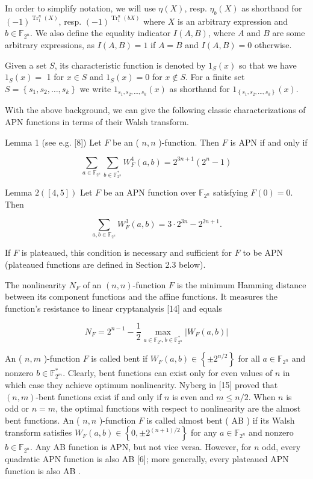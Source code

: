 \documentclass[10pt]{article}
\begin{document}
In order to simplify notation, we will use $\eta(X)$, resp. $\eta_{b}(X)$ as shorthand for $(-1)^{\operatorname{Tr}_{1}^{n}(X)}$, resp. $(-1)^{\operatorname{Tr}_{1}^{n}(b X)}$ where $X$ is an arbitrary expression and $b \in \mathbb{F}_{2^{n}}$. We also define the equality indicator $I(A, B)$, where $A$ and $B$ are some arbitrary expressions, as $I(A, B)=1$ if $A=B$ and $I(A, B)=0$ otherwise.

Given a set $S$, its characteristic function is denoted by $1_{S}(x)$ so that we have $1_{S}(x)=$ 1 for $x \in S$ and $1_{S}(x)=0$ for $x \notin S$. For a finite set $S=\left\{s_{1}, s_{2}, \ldots, s_{k}\right\}$ we write $1_{s_{1}, s_{2}, \ldots, s_{k}}(x)$ as shorthand for $1_{\left\{s_{1}, s_{2}, \ldots, s_{k}\right\}}(x)$.

With the above background, we can give the following classic characterizations of APN functions in terms of their Walsh transform.

Lemma 1 (see e.g. [8]) Let $F$ be an ( $n, n$ )-function. Then $F$ is APN if and only if

$$
\sum_{a \in \mathbb{F}_{2^{n}}} \sum_{b \in \mathbb{F}_{2^{n}}^{*}} W_{F}^{4}(a, b)=2^{3 n+1}\left(2^{n}-1\right)
$$

Lemma $2([4,5])$ Let $F$ be an APN function over $\mathbb{F}_{2^{n}}$ satisfying $F(0)=0$. Then

$$
\sum_{a, b \in \mathbb{F}_{2^{n}}} W_{F}^{3}(a, b)=3 \cdot 2^{3 n}-2^{2 n+1} .
$$

If $F$ is plateaued, this condition is necessary and sufficient for $F$ to be APN (plateaued functions are defined in Section 2.3 below).

The nonlinearity $N_{F}$ of an $(n, n)$-function $F$ is the minimum Hamming distance between its component functions and the affine functions. It measures the function's resistance to linear cryptanalysis [14] and equals


\begin{equation*}
N_{F}=2^{n-1}-\frac{1}{2} \max _{a \in \mathbb{F}_{2^{n}}, b \in \mathbb{F}_{2^{n}}^{*}}\left|W_{F}(a, b)\right| \tag{3}
\end{equation*}


An ( $n, m$ )-function $F$ is called bent if $W_{F}(a, b) \in\left\{ \pm 2^{n / 2}\right\}$ for all $a \in \mathbb{F}_{2^{n}}$ and nonzero $b \in \mathbb{F}_{2^{m}}^{*}$. Clearly, bent functions can exist only for even values of $n$ in which case they achieve optimum nonlinearity. Nyberg in [15] proved that $(n, m)$-bent functions exist if and only if $n$ is even and $m \leq n / 2$. When $n$ is odd or $n=m$, the optimal functions with respect to nonlinearity are the almost bent functions. An ( $n, n$ )-function $F$ is called almost bent ( AB ) if its Walsh transform satisfies $W_{F}(a, b) \in\left\{0, \pm 2^{(n+1) / 2}\right\}$ for any $a \in \mathbb{F}_{2^{n}}$ and nonzero $b \in \mathbb{F}_{2^{n}}$. Any AB function is APN, but not vice versa. However, for $n$ odd, every quadratic APN function is also AB [6]; more generally, every plateaued APN function is also AB .
\end{document}

